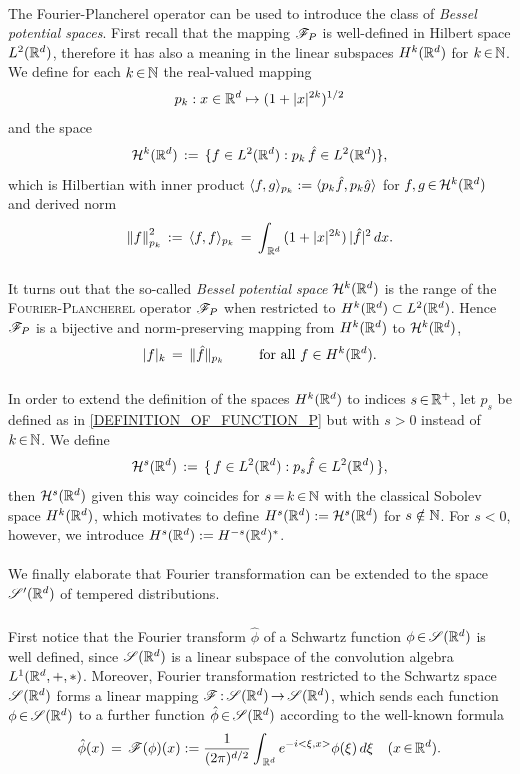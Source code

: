 \documentclass[11pt,twoside]{article}
\begin{document}
\paragraph{} %
The Fourier-Plancherel operator can be used
to introduce the class of \textit{Bessel potential spaces}.
First recall
that the mapping $\mathscr{F}_P$ is well-defined in Hilbert space $L^2({\mathbb{R}}^d)$,
therefore it has also a meaning in the linear subspaces $H^k({\mathbb{R}}^d)$
for $k {\,\in\,} {\mathbb{N}}$.
We define for each $k {\,\in\,} {\mathbb{N}}$ the real-valued mapping
\begin{equation}\label{DEFINITION_OF_FUNCTION_P}
p_k:x \in \Rd \mapsto (1 + \abs{x} ^{2k})^{1/2}
\end{equation}
and the space
\[
{\mathcal{H}}^k({\mathbb{R}}^d) \,:=\,
\{ f \in L^2({\mathbb{R}}^d): p_k \, \hat{f} \in L^2({\mathbb{R}}^d) \},
\]
which is Hilbertian with inner product
$\langle f,g \rangle_{p_k} := \langle p_k \hat{f},p_k \hat{g} \rangle$
for $f,g {\,\in\,} {\mathcal{H}}^k({\mathbb{R}}^d)$ and derived norm
\[
\norm{f}_{p_k}^2 \eqdef \scalar{f}{f}_{p_k} \=
\int_{\,\Rd} \, (1+\abs{x} ^{2k}) \, \abs{\hat{f}} ^2 \, dx.
\]

\subparagraph{}
It turns out
that the so-called \textit{Bessel potential space}
${\mathcal{H}}^k({\mathbb{R}}^d)$ is the range of
the \textsc{Fourier-Plancherel} operator $\mathscr{F}_P$
when restricted to $H^k({\mathbb{R}}^d) \subset L^2({\mathbb{R}}^d)$.
Hence $\mathscr{F}_P$ is a bijective and norm-preserving mapping
from $H^k({\mathbb{R}}^d)$ to ${\mathcal{H}}^k({\mathbb{R}}^d)$, {\ie}
\[
\abs{f} _k \= \lVert \hat{f} \rVert _{p_k}
\quad \, \qfa f \in H^k(\Rd).
\]

\subparagraph{}
In order to extend the definition of the spaces $H^k({\mathbb{R}}^d)$
to indices $s {\,\in\,} {\mathbb{R}}^+$,
let $p_s$ be defined as in \eqref{DEFINITION_OF_FUNCTION_P}
but with $s > 0$ instead of $k {\,\in\,} {\mathbb{N}}$.
We define
\[
{\mathcal{H}}^s({\mathbb{R}}^d) \,:=\,
\{ \, f \in L^2({\mathbb{R}}^d): p_s \hat{f} \in L^2({\mathbb{R}}^d) \, \},
\]
then ${\mathcal{H}}^s({\mathbb{R}}^d)$ given this way
coincides for $s {\,=\,} k {\,\in\,} {\mathbb{N}}$ with the classical Sobolev space $H^k({\mathbb{R}}^d)$,
which motivates to define $H^s({\mathbb{R}}^d) := {\mathcal{H}}^s({\mathbb{R}}^d)$ for $s \notin {\mathbb{N}}$.
For $s<0$,
however,
we introduce $H^s({\mathbb{R}}^d) := H^{-s}({\mathbb{R}}^d)^*$.

\paragraph{} %
We finally elaborate that Fourier transformation can be extended
to the space $\mathscr{S}'({\mathbb{R}}^d)$ of tempered distributions.

\subparagraph{}
First notice 
that the Fourier transform $\hat{\phi}$
of a Schwartz function $\phi {\,\in\,} \mathscr{S}({\mathbb{R}}^d)$ is well defined,
since $\mathscr{S}({\mathbb{R}}^d)$ is a linear subspace of the convolution algebra $L^1({\mathbb{R}}^d,+,\ast)$.
Moreover, 
Fourier transformation restricted to the Schwartz space $\mathscr{S}({\mathbb{R}}^d)$
forms a linear mapping $\mathscr{F} {\,:\,}\mathscr{S}({\mathbb{R}}^d) {\,\to\,} \mathscr{S}({\mathbb{R}}^d)$,
which sends each function $\phi {\,\in\,} \mathscr{S}({\mathbb{R}}^d)$ to a further function
$\hat{\phi} {\,\in\,} \mathscr{S}({\mathbb{R}}^d)$ according to the well-known formula
\begin{equation}\label{FOURIER_TRANSFORM_OF_SCHWARTZ_FUNCTION}
\hat{\phi}(x) \,=\, \mathscr{F}(\phi)(x) :=
\frac{1}{(2\pi)^{d/2}}
\int_{\,{\mathbb{R}}^d} e^{-i <\xi,x>} \phi(\xi) \, d \xi
\quad (x {\,\in\,} {\mathbb{R}}^d).
\end{equation}
\end{document}
